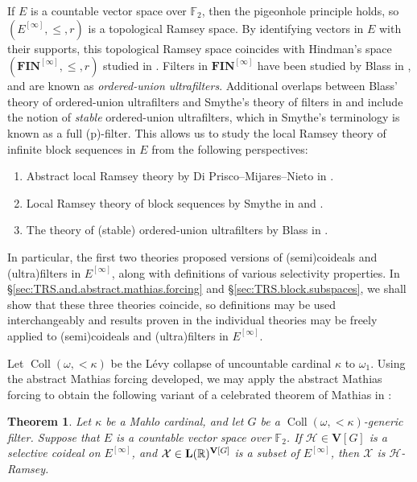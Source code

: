 \documentclass[11pt,reqno]{amsart}
\theoremstyle{plain}
\numberwithin{equation}{section}
\newtheorem{theorem}{Theorem}[section]
\theoremstyle{definition}
\newcommand{\func}{\operatorname}
\newcommand{\R}{\mathbb{R}}
\newcommand{\cal}{\mathcal}
\renewcommand{\bf}{\mathbf}
\newcommand{\Coll}{\func{Coll}}
\newcommand{\FIN}{\bf{FIN}}
\newcommand{\V}{\bf{V}}
\newcommand{\X}{\cal{X}}
\renewcommand{\H}{\cal{H}}
\let\strokeL\L
\DeclareRobustCommand{\L}{\ifmmode\mathbf{L}\else\strokeL\fi}
\let\Sec\S
\renewcommand{\S}{\mathcal{S}}
\begin{document}
If $E$ is a countable vector space over $\mathbb{F}_2$, then the pigeonhole principle holds, so $(E^{[\infty]},\leq,r)$ is a topological Ramsey space. By identifying vectors in $E$ with their supports, this topological Ramsey space coincides with Hindman's space $(\FIN^{[\infty]},\leq,r)$ studied in \cite{B87}. Filters in $\FIN^{[\infty]}$ have been studied by Blass in \cite{B87}, and are known as \emph{ordered-union ultrafilters}. Additional overlaps between Blass' theory of ordered-union ultrafilters and Smythe's theory of filters in \cite{S18} and \cite{S23} include the notion of \emph{stable} ordered-union ultrafilters, which in Smythe's terminology is known as a full (p)-filter. This allows us to study the local Ramsey theory of infinite block sequences in $E$ from the following perspectives:
\begin{enumerate}
    \item Abstract local Ramsey theory by Di Prisco--Mijares--Nieto in \cite{DMN15}.
    
    \item Local Ramsey theory of block sequences by Smythe in \cite{S18} and \cite{S23}.
    
    \item The theory of (stable) ordered-union ultrafilters by Blass in \cite{B87}.
\end{enumerate}
In particular, the first two theories proposed versions of (semi)coideals and (ultra)filters in $E^{[\infty]}$, along with definitions of various selectivity properties. In \Sec\ref{sec:TRS.and.abstract.mathias.forcing} and \Sec\ref{sec:TRS.block.subspaces}, we shall show that these three theories coincide, so definitions may be used interchangeably and results proven in the individual theories may be freely applied to (semi)coideals and (ultra)filters in $E^{[\infty]}$.

Let $\Coll(\omega,<\!\kappa)$ be the L\'{e}vy collapse of uncountable cardinal $\kappa$ to $\omega_1$. Using the abstract Mathias forcing developed, we may apply the abstract Mathias forcing to obtain the following variant of a celebrated theorem of Mathias in \cite{M77}:
\begin{theorem}
\label{thm:mathias.thm.vector.spaces}
    Let $\kappa$ be a Mahlo cardinal, and let $G$ be a $\Coll(\omega,<\!\kappa)$-generic filter. Suppose that $E$ is a countable vector space over $\mathbb{F}_2$. If $\H \in \V[G]$ is a selective coideal on $E^{[\infty]}$, and $\X \in \L(\R)^{\V[G]}$ is a subset of $E^{[\infty]}$, then $\X$ is $\H$-Ramsey.
\end{theorem}
\end{document}
